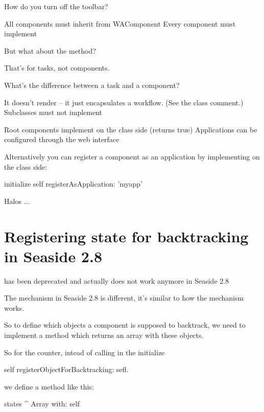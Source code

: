 \documentclass[a4paper,10pt,twoside]{book}
\begin{document}
\begin{faq}
How do you turn off the toolbar?
\end{faq}
\answer
All components must inherit from WAComponent
Every component must implement 

\begin{faq}
But what about the  method?
\end{faq}
\answer
That's for tasks, not components.

\begin{faq}
What's the difference between a task and a component?
\end{faq}
\answer
It doesn't render -- it just encapsulates a workflow.
(See the class comment.)
Subclasses must not implement 

Root components implement  on the class side (returns true)
Applications can be configured through the web interface

Alternatively you can register a component as an application by implementing  on the class side:
\begin{code}
initialize
	self registerAsApplication: 'myapp'
\end{code}

Halos ...

\section{Registering state for backtracking in Seaside 2.8}

 has been deprecated and actually does not work
anymore in Seaside 2.8


The mechanism in Seaside 2.8 is different, it's similar to how the  mechanism works.

So to define which objects a component is supposed to backtrack, we need to implement a method  which returns an array with these objects.

So for the counter, intead of calling in the initialize

\begin{code}
	self registerObjectForBacktracking: sefl.
\end{code}

we define a method  like this:

\begin{code}
states
	^ Array with: self
\end{code}
\end{document}
